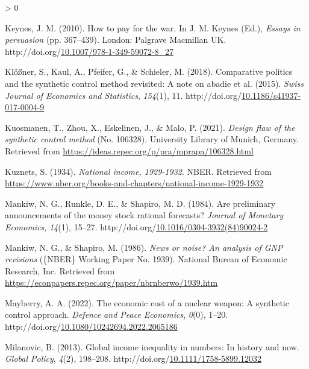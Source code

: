 \documentclass[12pt,nobind, a4paper]{reedthesis}
\newlength{\cslhangindent}
\newenvironment{CSLReferences}[2] %
{%
	\setlength{\parindent}{0pt}
	\ifodd #1 \everypar{\setlength{\hangindent}{\cslhangindent}}\ignorespaces\fi
	\ifnum #2 > 0
	\setlength{\parskip}{#2\baselineskip}
	\fi
}%
{}
\begin{document}
\begin{CSLReferences}{1}{0}
 \leavevmode\hypertarget{ref-keynes_how_2010}{}%
 Keynes, J. M. (2010). How to pay for the war. In J. M. Keynes (Ed.), \emph{Essays in persuasion} (pp. 367--439). London: Palgrave Macmillan {UK}. http://doi.org/\href{https://doi.org/10.1007/978-1-349-59072-8_27}{10.1007/978-1-349-59072-8\_27}

 \leavevmode\hypertarget{ref-klosner_comparative_2018}{}%
 Klößner, S., Kaul, A., Pfeifer, G., \& Schieler, M. (2018). Comparative politics and the synthetic control method revisited: A note on abadie et al. (2015). \emph{Swiss Journal of Economics and Statistics}, \emph{154}(1), 11. http://doi.org/\href{https://doi.org/10.1186/s41937-017-0004-9}{10.1186/s41937-017-0004-9}

 \leavevmode\hypertarget{ref-kuosmanen_design_2021}{}%
 Kuosmanen, T., Zhou, X., Eskelinen, J., \& Malo, P. (2021). \emph{Design flaw of the synthetic control method} (No. 106328). University Library of Munich, Germany. Retrieved from \url{https://ideas.repec.org/p/pra/mprapa/106328.html}

 \leavevmode\hypertarget{ref-kuznets_national_1934}{}%
 Kuznets, S. (1934). \emph{National income, 1929-1932}. {NBER}. Retrieved from \url{https://www.nber.org/books-and-chapters/national-income-1929-1932}

 \leavevmode\hypertarget{ref-mankiw_are_1984}{}%
 Mankiw, N. G., Runkle, D. E., \& Shapiro, M. D. (1984). Are preliminary announcements of the money stock rational forecasts? \emph{Journal of Monetary Economics}, \emph{14}(1), 15--27. http://doi.org/\href{https://doi.org/10.1016/0304-3932(84)90024-2}{10.1016/0304-3932(84)90024-2}

 \leavevmode\hypertarget{ref-mankiw_news_1986}{}%
 Mankiw, N. G., \& Shapiro, M. (1986). \emph{News or noise? An analysis of {GNP} revisions} (\{NBER\} Working Paper No. 1939). National Bureau of Economic Research, Inc. Retrieved from \url{https://econpapers.repec.org/paper/nbrnberwo/1939.htm}

 \leavevmode\hypertarget{ref-mayberry_economic_2022}{}%
 Mayberry, A. A. (2022). The economic cost of a nuclear weapon: A synthetic control approach. \emph{Defence and Peace Economics}, \emph{0}(0), 1--20. http://doi.org/\href{https://doi.org/10.1080/10242694.2022.2065186}{10.1080/10242694.2022.2065186}

 \leavevmode\hypertarget{ref-milanovic_global_2013}{}%
 Milanovic, B. (2013). Global income inequality in numbers: In history and now. \emph{Global Policy}, \emph{4}(2), 198--208. http://doi.org/\href{https://doi.org/10.1111/1758-5899.12032}{10.1111/1758-5899.12032}


\end{CSLReferences}
\end{document}
